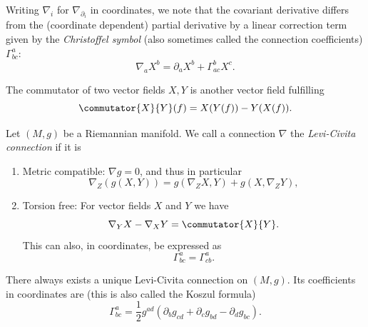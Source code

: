 \documentclass[titlepage,numbers=noenddot,oneside,%
cleardoublepage=empty,paper=a4,fontsize=11pt,%
english,%
]{scrartcl}
\begin{document}
\begin{remark}
    Writing \( \nabla_i \) for \( \nabla_{\partial_i} \) in coordinates, we note that the covariant derivative differs from the (coordinate dependent) partial derivative by a linear correction term given by the \emph{Christoffel symbol} (also sometimes called the connection coefficients) \( \Gamma^a_{b c} \):
    \begin{equation*}
        \nabla_{a} X^b = \partial_a X^b+\Gamma_{ac}^b X^c.
    \end{equation*}
\end{remark}
\begin{recall}
    The commutator of two vector fields \( X,Y \) is another vector field fulfilling
    \begin{equation*}
        \commutator{X}{Y}(f)=X(Y(f))-Y(X(f)).
    \end{equation*}
\end{recall}
\begin{theorem}
    Let \( (M,g) \) be a Riemannian manifold. We call a connection \( \nabla \) the \emph{Levi-Civita connection} if it is
    \begin{enumerate}
        \item Metric compatible: \( \nabla g=0 \), and thus in particular
        \begin{equation*}
            \nabla_Z (g(X,Y))=g(\nabla_Z X, Y)+g(X,\nabla_Z Y),
        \end{equation*}
        \item Torsion free: For vector fields \( X \) and \( Y \) we have
        \begin{equation*}
            \nabla_Y X-\nabla_X Y=\commutator{X}{Y}.
        \end{equation*}
        This can also, in coordinates, be expressed as
        \begin{equation*}
            \Gamma^{a}_{bc} = \Gamma^a_{cb}.
        \end{equation*}
    \end{enumerate}
    There always exists a unique Levi-Civita connection on \( (M,g) \). Its coefficients in coordinates are (this is also called the Koszul formula)
    \begin{equation}
        \Gamma^a_{bc}=\frac{1}{2}g^{ad}(\partial_b g_{cd}+\partial_c g_{bd}-\partial_d g_{bc}).\label{eq:koszul_formula}
    \end{equation}
\end{theorem}
\end{document}
